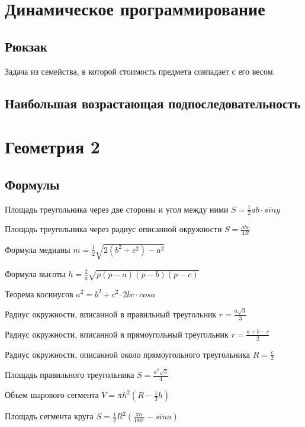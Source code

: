 \documentclass[a4paper]{article}
\begin{document}
\begin{multicols*}{2}
		  \section{Динамическое программирование}
		  \subsection{Рюкзак}
		  Задача из семейства, в которой стоимость предмета совпадает с его весом.
		  
		  \subsection{Наибольшая возрастающая подпоследовательность}
		  
		  \section{Геометрия 2}
		  
		  \subsection{Формулы}
		  Площадь треугольника через две стороны и
		  угол между ними
$S = \frac{1}{2}ab\cdot siny$
		  
		 Площадь треугольника через радиус
		 описанной окружности $ S = \frac{abc}{4R} $
		 
		 Формула медианы 
		 $ m = \frac{1}{2} \sqrt{2(b^2 + c^ 2) - a^2}$
		 
		 Формула высоты
		 $ h = \frac{2}{a} \sqrt{p(p-a)(p-b)(p-c)} $
		 
		 Теорема косинусов
		 $ a^2 = b^2 + c^2 – 2bc\cdot cos a$
		 
		 Радиус окружности, вписанной в правильный
		 треугольник
		 $r = \frac{a\sqrt{3}}{3} $
		 
		 Радиус окружности, вписанной в
		 прямоугольный треугольник
		 $r = \frac{a+b-c}{2} $
		 
		 Радиус окружности, описанной около
		 прямоугольного треугольника
		 $R = \frac{c}{2} $
		 
		 Площадь правильного треугольника
		 $ S = \frac{a^2 \sqrt{3}}{4} $
		 
		 Объем шарового сегмента
		 $ V = \pi h^2(R-\frac{1}{3}h) $
		 
		 Площадь сегмента круга
		 $ S = \frac{1}{2}R^2(\frac{\pi\alpha}{180^{\circ}} - sin a) $
		 

\end{multicols*}
\end{document}
